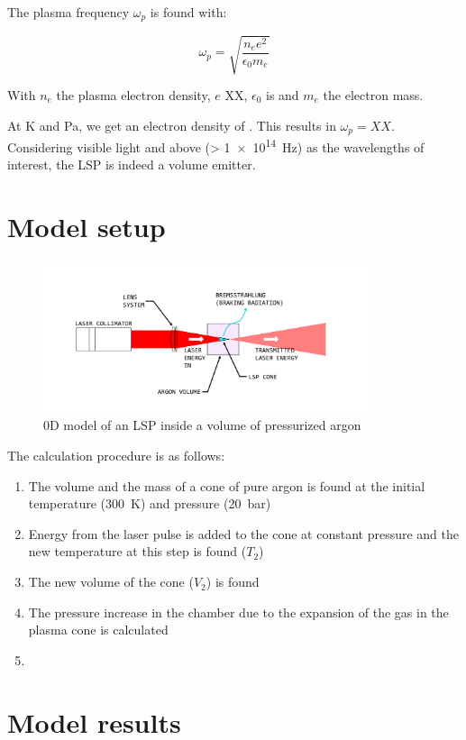         The plasma frequency $\omega_p$ is found with: 

        \begin{equation}
            \omega_p = \sqrt{\frac{n_e e^2}{\epsilon_0 m_e}}
        \end{equation}

        With $n_e$ the plasma electron density, $e$ XX, $\epsilon_0$ is  and $m_e$ the electron mass.

        At  K and  Pa, we get an electron density of . This results in $\omega_p = XX$. Considering visible light and above (> \qty{1e14}{Hz}) as the wavelengths of interest, the LSP is indeed a volume emitter.

    \section{Model setup}
        
        \begin{figure}[!ht]
            \centering
            \includegraphics[width=0.85\textwidth]{assets/2 models/Modeling figure.pdf}
            \caption{0D model of an LSP inside a volume of pressurized argon}
            \label{fig:0D model}
        \end{figure}

        The calculation procedure is as follows:

        \begin{enumerate}
            \item The volume and the mass of a cone of pure argon is found at the initial temperature (\qty{300}{K}) and pressure (\qty{20}{bar})
            \item Energy from the laser pulse is added to the cone at constant pressure and the new temperature at this step is found ($T_2$)
            \item The new volume of the cone ($V_2$) is found
            \item The pressure increase in the chamber due to the expansion of the gas in the plasma cone is calculated
            \item 
          \end{enumerate}

    \section{Model results}
